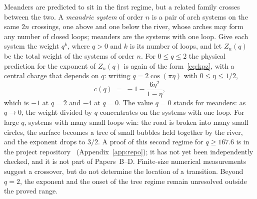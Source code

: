 Meanders are predicted to sit in the first regime, but a related family crosses between the two.
A \emph{meandric system} of order $n$ is a pair of arch systems on the same $2n$ crossings, one
above and one below the river, whose arches may form any number of closed loops; meanders are the
systems with one loop. Give each system the weight $q^{k}$, where $q>0$ and $k$ is its number of
loops, and let $Z_n(q)$ be the total weight of the systems of order $n$. For $0\le q\le 2$ the
physical prediction for the exponent of $Z_n(q)$ is again of the form~\eqref{eq:kpz}, with a
central charge that depends on $q$: writing $q=2\cos(\pi\eta)$ with $0\le \eta\le 1/2$,
\[ c(q) \;=\; -1-\frac{6\eta^2}{1-\eta}, \]
which is $-1$ at $q=2$ and $-4$ at $q=0$. The value $q=0$ stands for meanders: as $q\to0$, the
weight divided by $q$ concentrates on the systems with one loop. For large $q$,
systems with many small loops win: the road is broken into many small circles, the surface
becomes a tree of small bubbles held together by the river, and the exponent drops to $3/2$. A
proof of this second regime for $q\ge 167.6$ is in the project repository~\cite{Repo}
(Appendix~\ref{app:repo}); it has not yet been independently checked, and it is not part of
Papers~B--D. Finite-size numerical measurements suggest a crossover, but do not determine the location of a
transition. Beyond $q=2$, the exponent and the onset of the tree regime remain unresolved outside the proved range.
